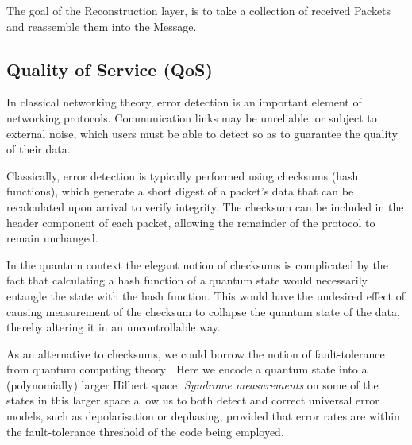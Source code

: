 \documentclass[aps,rmp,twocolumn,amsmath,amssymb,nofootinbib,superscriptaddress]{revtex4}
\begin{document}
\begin{table}[!htb]
\caption{The goal of the {\sc Reconstruction} layer, is to take a collection of received {\sc Packets} and reassemble them into the {\sc Message}.} \label{tab:reconstruction}
\end{table}

%
%

\subsection{Quality of Service (QoS)}

In classical networking theory, error detection is an important element of networking protocols. Communication links may be unreliable, or subject to external noise, which users must be able to detect so as to guarantee the quality of their data.

Classically, error detection is typically performed using checksums (hash functions), which generate a short digest of a packet's data that can be recalculated upon arrival to verify integrity. The checksum can be included in the header component of each packet, allowing the remainder of the protocol to remain unchanged.

In the quantum context the elegant notion of checksums is complicated by the fact that calculating a hash function of a quantum state would necessarily entangle the state with the hash function. This would have the undesired effect of causing measurement of the checksum to collapse the quantum state of the data, thereby altering it in an uncontrollable way.

As an alternative to checksums, we could borrow the notion of fault-tolerance from quantum computing theory \cite{???}. Here we encode a quantum state into a (polynomially) larger Hilbert space. \emph{Syndrome measurements} on some of the states in this larger space allow us to both detect and correct universal error models, such as depolarisation or dephasing, provided that error rates are within the fault-tolerance threshold of the code being employed.
\end{document}
